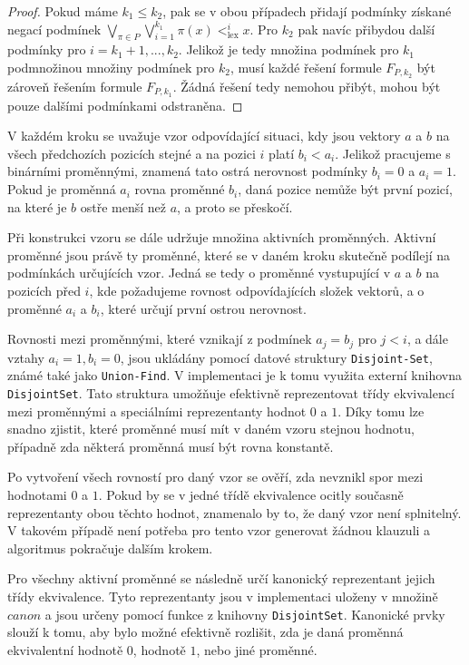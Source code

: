 \begin{proof}
Pokud máme $k_1\leq k_2$, pak se v obou případech přidají podmínky získané negací podmínek $\bigvee_{\pi \in P} \bigvee_{i=1}^{k_1} \pi(x) <_{\text{lex}}^{i} x$. Pro $k_2$ pak navíc přibydou další podmínky pro $i=k_1+1,...,k_2$. Jelikož je tedy množina podmínek pro $k_1$ podmnožinou množiny podmínek pro $k_2$, musí každé řešení formule $F_{P,k_2}$ být zároveň řešením formule $F_{P,k_1}$. Žádná řešení tedy nemohou přibýt, mohou být pouze dalšími podmínkami odstraněna.
\end{proof}

V každém kroku se uvažuje vzor odpovídající situaci, kdy jsou vektory $a$ a $b$ na všech předchozích pozicích stejné a na pozici $i$ platí $b_i < a_i$. Jelikož pracujeme s binárními proměnnými, znamená tato ostrá nerovnost podmínky $b_i = 0$ a $a_i = 1$. Pokud je proměnná $a_i$ rovna proměnné $b_i$, daná pozice nemůže být první pozicí, na které je $b$ ostře menší než $a$, a proto se přeskočí.

Při konstrukci vzoru se dále udržuje množina aktivních proměnných. Aktivní proměnné jsou právě ty proměnné, které se v daném kroku skutečně podílejí na podmínkách určujících vzor. Jedná se tedy o proměnné vystupující v $a$ a $b$ na pozicích před $i$, kde požadujeme rovnost odpovídajících složek vektorů, a o proměnné $a_i$ a $b_i$, které určují první ostrou nerovnost.

Rovnosti mezi proměnnými, které vznikají z podmínek $a_j = b_j$ pro $j < i$, a dále vztahy $a_i = 1, b_i = 0$, jsou ukládány pomocí datové struktury \texttt{Disjoint-Set}, známé také jako \texttt{Union-Find}. V implementaci je k tomu využita externí knihovna \texttt{DisjointSet}. Tato struktura umožňuje efektivně reprezentovat třídy ekvivalencí mezi proměnnými a speciálními reprezentanty hodnot $0$ a $1$. Díky tomu lze snadno zjistit, které proměnné musí mít v daném vzoru stejnou hodnotu, případně zda některá proměnná musí být rovna konstantě.

Po vytvoření všech rovností pro daný vzor se ověří, zda nevznikl spor mezi hodnotami $0$ a $1$. Pokud by se v jedné třídě ekvivalence ocitly současně reprezentanty obou těchto hodnot, znamenalo by to, že daný vzor není splnitelný. V takovém případě není potřeba pro tento vzor generovat žádnou klauzuli a algoritmus pokračuje dalším krokem.

Pro všechny aktivní proměnné se následně určí kanonický reprezentant jejich třídy ekvivalence. Tyto reprezentanty jsou v implementaci uloženy v množině $canon$ a jsou určeny pomocí funkce z knihovny \texttt{DisjointSet}. Kanonické prvky slouží k tomu, aby bylo možné efektivně rozlišit, zda je daná proměnná ekvivalentní hodnotě $0$, hodnotě $1$, nebo jiné proměnné.

